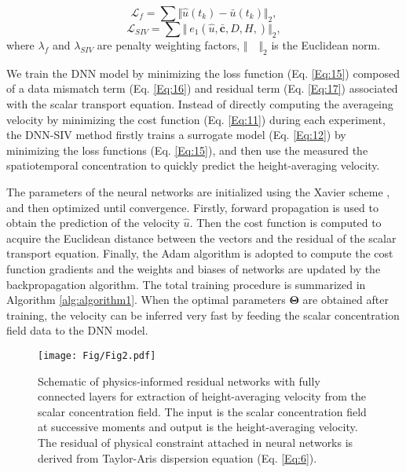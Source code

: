 \documentclass{article}
\begin{document}
\begin{equation}
	\mathcal{L}_f=\sum\Vert\hat{u}\left(t_k\right)-\bar{u}\left(t_k\right)\Vert_2,
	\label{Eq:16}
\end{equation}
\begin{equation}
	\mathcal{L}_{SIV}=\sum\Vert\ e_1\left(\hat{u},\bar{\mathbf{c}},D,H,\right)\Vert_2,
	\label{Eq:17}
\end{equation}
where $\lambda_f$ and $\lambda_{SIV}$ are penalty weighting factors, $\Vert\quad\Vert_2$ is the Euclidean norm.
\par
We train the DNN model by minimizing the loss function (Eq. \ref{Eq:15}) composed of a data mismatch term (Eq. \ref{Eq:16}) and residual term (Eq. \ref{Eq:17}) associated with the scalar transport equation. Instead of directly computing the averageing velocity by minimizing the cost function (Eq. \ref{Eq:11}) during each experiment, the DNN-SIV method firstly trains a surrogate model (Eq. \ref{Eq:12}) by minimizing the loss functions (Eq. \ref{Eq:15}), and then use the measured the spatiotemporal concentration to quickly predict the height-averaging velocity. \par
The parameters of the neural networks are initialized using the Xavier scheme \citep{glorot2010understanding}, and then optimized until convergence. Firstly, forward propagation is used to obtain the prediction of the velocity $\hat{u}$. Then the cost function is computed to acquire the Euclidean distance between the vectors and the residual of the scalar transport equation. Finally, the Adam algorithm \citep{kingma2014adam} is adopted to compute the cost function gradients and the weights and biases of networks are updated by the backpropagation algorithm. The total training procedure is summarized in Algorithm \ref{alg:algorithm1}. When the optimal parameters $\mathbf{\Theta}$ are obtained after training, the velocity can be inferred very fast by feeding the scalar concentration field data to the DNN model.
\begin{figure}
	\centering
	\texttt{[image: Fig/Fig2.pdf]}
	\caption{Schematic of physics-informed residual networks with fully connected layers for extraction of height-averaging velocity from the scalar concentration field. The input is the scalar concentration field at successive moments and output is the height-averaging velocity. The residual of physical constraint attached in neural networks is derived from Taylor-Aris dispersion equation (Eq. \ref{Eq:6}).}
	\label{fig:fig2}
\end{figure}
\end{document}
